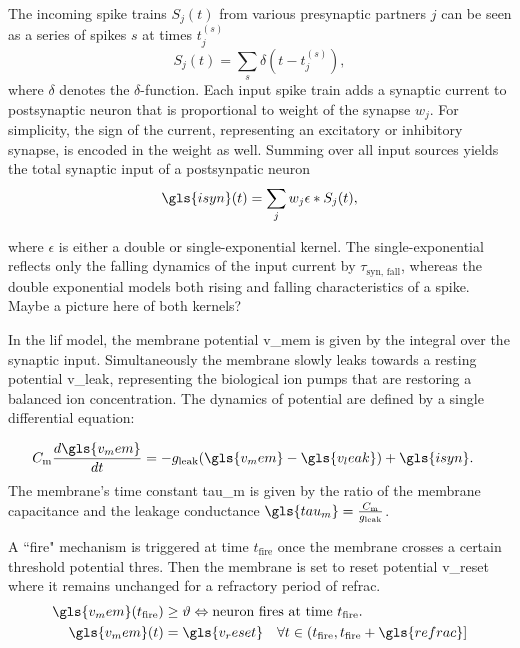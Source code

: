 The incoming spike trains $S_j(t)$ from various presynaptic partners $j$ can be seen as a series of spikes $s$ at times $t_j^{(s)}$
\begin{equation}
S_j(t) = \sum_s \delta(t - t_j^{(s)}),
\end{equation}
where $\delta$ denotes the $\delta$-function. Each input spike train adds a synaptic current to postsynaptic neuron that is proportional to weight of the synapse $w_j$. For simplicity, the sign of the current, representing an excitatory or inhibitory synapse, is encoded in the weight as well. Summing over all input sources yields the total synaptic input of a postsynpatic neuron
\begin{equation}
\label{synpatic_input}
\gls{isyn}(t) = \sum_j w_j \epsilon \ast S_j(t),
\end{equation}

where $\epsilon$ is either a double or single-exponential kernel. The single-exponential reflects only the falling dynamics of the input current by $\tau_\text{syn, fall}$, whereas the double exponential models both rising and falling characteristics of a spike. Maybe a picture here of both kernels?

In the \gls{lif} model, the membrane potential \gls{v_mem} is given by the integral over the synaptic input. Simultaneously the membrane slowly leaks towards a resting potential \gls{v_leak}, representing the biological ion pumps that are restoring a balanced ion concentration. The dynamics of potential are defined by a single differential equation:

\begin{align}
\label{lifeq}
C_{\text{m}} \frac{d\gls{v_mem}}{dt} &= -g_{\text{leak}} (\gls{v_mem} - \gls{v_leak}) + \gls{isyn}.
\end{align}
%
The membrane's time constant \gls{tau_m} is given by the ratio of the membrane capacitance and the leakage conductance $\gls{tau_m} = \frac{C_{\text{m}}}{g_{\text{leak}}}$.

A ``fire" mechanism is triggered at time $t_{\text{fire}}$ once the membrane crosses a certain threshold potential \gls{thres}. Then the membrane is set to reset potential \gls{v_reset} where it remains unchanged for a refractory period of \gls{refrac}. 
\begin{align}
\gls{v_mem}(t_{\text{fire}}) &\ge \vartheta \Leftrightarrow \text{neuron fires at time } t_{\text{fire}}.\\
\gls{v_mem}(t) &= \gls{v_reset} \quad \forall t \in (t_{\text{fire}}, t_{\text{fire}} + \gls{refrac}] 
\end{align}


